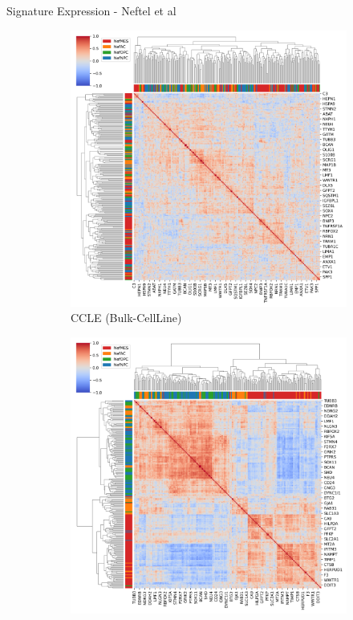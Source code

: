 \documentclass[aspectratio=169,9pt]{beamer}
\begin{document}
    \begin{frame}{Signature Expression - Neftel et al}
        \begin{adjustwidth}{-5cm}{-5cm}
            \centering
            \begin{figure}
                \centering
                \begin{subfigure}[c]{0.48\textwidth}
                    \centering
                    \includegraphics[width=\textwidth]{CCLE_Corrplot_Nef}
                    \caption{CCLE (Bulk-CellLine)}
                \end{subfigure}
                \begin{subfigure}[c]{0.48\textwidth}
                    \centering
                    \includegraphics[width=\textwidth]{TCGA_Corrplot_Nef}

\end{subfigure}
\end{figure}
\end{adjustwidth}
\end{frame}
\end{document}
